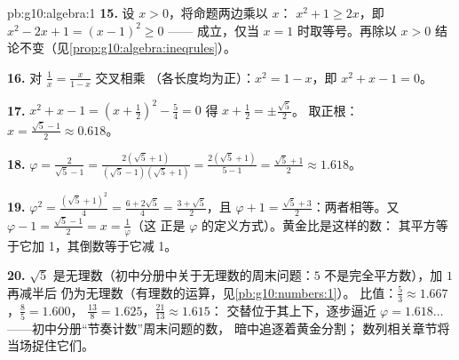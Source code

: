\begin{solution}{pb:g10:algebra:1}
\textbf{15.} 设 $x > 0$，将命题两边乘以 $x$：
$x^2 + 1 \geq 2x$，即 $x^2 - 2x + 1 = (x - 1)^2 \geq 0$ ——
成立，仅当 $x = 1$ 时取等号。再除以 $x > 0$
结论不变（见\cref{prop:g10:algebra:ineqrules}）。

\textbf{16.} 对 $\frac1x = \frac{x}{1 - x}$ 交叉相乘
（各长度均为正）：$x^2 = 1 - x$，即
$x^2 + x - 1 = 0$。

\textbf{17.} $x^2 + x - 1 = \left(x + \frac12\right)^2 -
\frac54 = 0$ 得 $x + \frac12 = \pm\frac{\sqrt5}{2}$。
取正根：$x = \frac{\sqrt5 - 1}{2} \approx 0.618$。

\textbf{18.} $\varphi = \frac{2}{\sqrt5 - 1} =
\frac{2(\sqrt5 + 1)}{(\sqrt5 - 1)(\sqrt5 + 1)}
= \frac{2(\sqrt5 + 1)}{5 - 1} = \frac{\sqrt5 + 1}{2}
\approx 1.618$。

\textbf{19.} $\varphi^2 = \frac{(\sqrt5 + 1)^2}{4} =
\frac{6 + 2\sqrt5}{4} = \frac{3 + \sqrt5}{2}$，且
$\varphi + 1 = \frac{\sqrt5 + 3}{2}$：两者相等。又
$\varphi - 1 = \frac{\sqrt5 - 1}{2} = x = \frac1\varphi$（这
正是 $\varphi$ 的定义方式）。黄金比是这样的数：
其平方等于它加 1，其倒数等于它减 1。

\textbf{20.} $\sqrt5$ 是无理数（初中分册中关于无理数的周末问题：$5$
不是完全平方数），加 $1$ 再减半后
仍为无理数（有理数的运算，见\cref{pb:g10:numbers:1}）。
比值：$\frac53 \approx 1.667$，$\frac85 = 1.600$，
$\frac{13}{8} = 1.625$，$\frac{21}{13} \approx 1.615$：
交替位于其上下，逐步逼近
$\varphi = 1.618\ldots$ ——初中分册“节奏计数”周末问题的数，
暗中追逐着黄金分割；
数列相关章节将当场捉住它们。
\end{solution}
